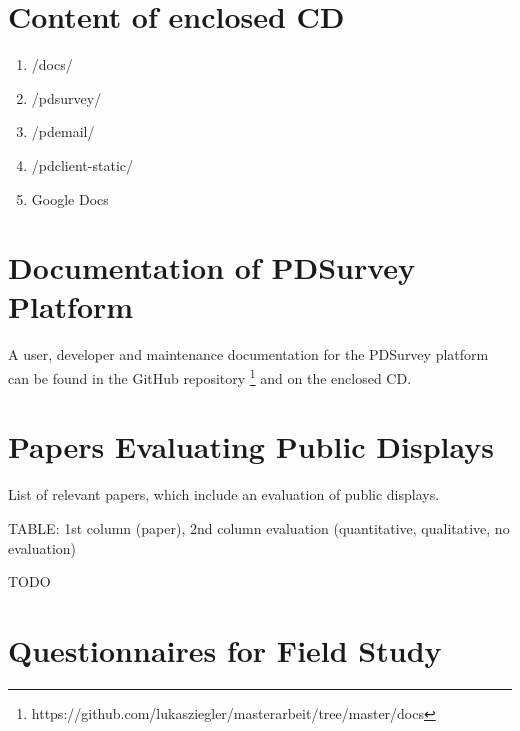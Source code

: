 \section{Content of enclosed CD}
\label{appendix:cd-contents}


    \begin{enumerate}
    \item /docs/
    \item /pdsurvey/
    \item /pdemail/
    \item /pdclient-static/
    \item Google Docs
    \end{enumerate}




\section{Documentation of PDSurvey Platform}
\label{appendix:documentation}

  A user, developer and maintenance documentation for the PDSurvey platform can be found in the GitHub repository \footnote{https://github.com/lukasziegler/masterarbeit/tree/master/docs} and on the enclosed CD.




\section{Papers Evaluating Public Displays}
  
  List of relevant papers, which include an evaluation of public displays.

  TABLE: 1st column (paper), 2nd column evaluation (quantitative, qualitative, no evaluation)

  TODO




\section{Questionnaires for Field Study}
\label{appendix:papers}





